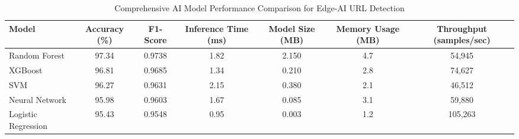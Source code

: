 \begin{table}[!t]
\centering
\caption{Comprehensive AI Model Performance Comparison for Edge-AI URL Detection}
\label{tab:model_comparison}
\begin{tabular}{|l|c|c|c|c|c|c|}
\hline
\textbf{Model} & \textbf{Accuracy (\%)} & \textbf{F1-Score} & \textbf{Inference Time (ms)} & \textbf{Model Size (MB)} & \textbf{Memory Usage (MB)} & \textbf{Throughput (samples/sec)} \\
\hline
Random Forest & 97.34 & 0.9738 & 1.82 & 2.150 & 4.7 & 54,945 \\
XGBoost & 96.81 & 0.9685 & 1.34 & 0.210 & 2.8 & 74,627 \\
SVM & 96.27 & 0.9631 & 2.15 & 0.380 & 2.1 & 46,512 \\
Neural Network & 95.98 & 0.9603 & 1.67 & 0.085 & 3.1 & 59,880 \\
Logistic Regression & 95.43 & 0.9548 & 0.95 & 0.003 & 1.2 & 105,263 \\
\hline
\end{tabular}
\end{table}
